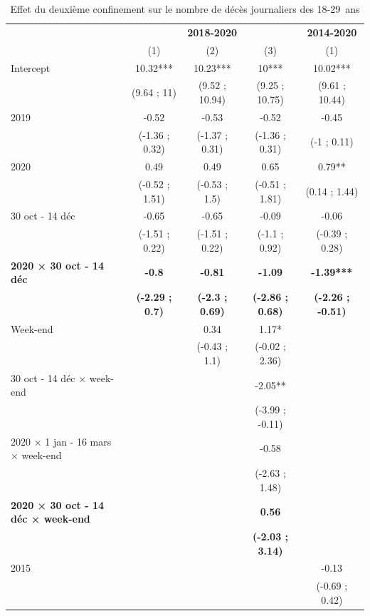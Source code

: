 \documentclass[titlepage]{article}
\begin{document}
\begin{landscape}
\begin{table}[H]

\caption{\label{tab:reg-conf2}Effet du deuxième confinement sur le nombre de décès journaliers des 18-29 ans}
\centering
\fontsize{10}{12}\selectfont
\begin{threeparttable}
\begin{tabular}[t]{lcccc}
\toprule
\multicolumn{1}{c}{\textbf{}} & \multicolumn{3}{c}{\textbf{2018-2020}} & \multicolumn{1}{c}{\textbf{2014-2020}} \\
\cmidrule(l{3pt}r{3pt}){2-4} \cmidrule(l{3pt}r{3pt}){5-5}
  & (1) & (2) & (3) & (1)\\
\midrule
Intercept & 10.32*** & 10.23*** & 10*** & 10.02***\\
 & (9.64 ; 11) & (9.52 ; 10.94) & (9.25 ; 10.75) & (9.61 ; 10.44)\\
2019 & -0.52 & -0.53 & -0.52 & -0.45\\
 & (-1.36 ; 0.32) & (-1.37 ; 0.31) & (-1.36 ; 0.31) & (-1 ; 0.11)\\
2020 & 0.49 & 0.49 & 0.65 & 0.79**\\
 & (-0.52 ; 1.51) & (-0.53 ; 1.5) & (-0.51 ; 1.81) & (0.14 ; 1.44)\\
30 oct - 14 déc & -0.65 & -0.65 & -0.09 & -0.06\\
 & (-1.51 ; 0.22) & (-1.51 ; 0.22) & (-1.1 ; 0.92) & (-0.39 ; 0.28)\\
\textbf{2020 × 30 oct - 14 déc} & \textbf{-0.8} & \textbf{-0.81} & \textbf{-1.09} & \textbf{-1.39***}\\
\textbf{} & \textbf{(-2.29 ; 0.7)} & \textbf{(-2.3 ; 0.69)} & \textbf{(-2.86 ; 0.68)} & \textbf{(-2.26 ; -0.51)}\\
Week-end &  & 0.34 & 1.17* & \\
 &  & (-0.43 ; 1.1) & (-0.02 ; 2.36) & \\
30 oct - 14 déc × week-end &  &  & -2.05** & \\
 &  &  & (-3.99 ; -0.11) & \\
2020 × 1 jan - 16 mars × week-end &  &  & -0.58 & \\
 &  &  & (-2.63 ; 1.48) & \\
\textbf{2020 × 30 oct - 14 déc × week-end} & \textbf{} & \textbf{} & \textbf{0.56} & \textbf{}\\
\textbf{} & \textbf{} & \textbf{} & \textbf{(-2.03 ; 3.14)} & \textbf{}\\
2015 &  &  &  & -0.13\\
 &  &  &  & (-0.69 ; 0.42)\\

\end{tabular}
\end{threeparttable}
\end{table}
\end{landscape}
\end{document}
